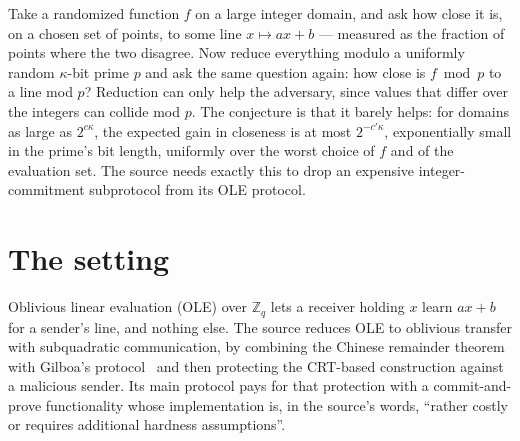 \documentclass{aicr-conjecture}
\begin{document}

\vspace{0.4em}

\begin{informalconjecture}
Take a randomized function $f$ on a large integer domain, and ask how
close it is, on a chosen set of points, to some line $x \mapsto ax + b$
--- measured as the fraction of points where the two disagree. Now
reduce everything modulo a uniformly random $\kappa$-bit prime $p$ and
ask the same question again: how close is $f \bmod p$ to a line mod $p$?
Reduction can only help the adversary, since values that differ over the
integers can collide mod $p$. The conjecture is that it barely helps: for
domains as large as $2^{c \kappa}$, the expected gain in closeness is at
most $2^{-c' \kappa}$, exponentially small in the prime's bit length,
uniformly over the worst choice of $f$ and of the evaluation set. The
source needs exactly this to drop an expensive integer-commitment
subprotocol from its OLE protocol.
\end{informalconjecture}

\section{The setting}\label{sec:setting}

Oblivious linear evaluation (OLE) over $\mathbb{Z}_{q}$ lets a receiver
holding $x$ learn $ax + b$ for a sender's line, and nothing else. The
source reduces OLE to oblivious transfer with subquadratic
communication, by combining the Chinese remainder theorem with Gilboa's
protocol~\cite{Gil99} and then protecting the CRT-based construction
against a malicious sender. Its main protocol pays for that protection
with a commit-and-prove functionality whose implementation is, in the
source's words, ``rather costly or requires additional hardness
assumptions''.
\end{document}
